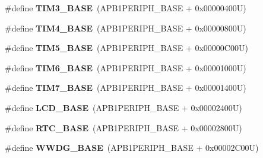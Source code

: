 \begin{DoxyCompactItemize}
\item 
\hypertarget{group___peripheral__memory__map_gaf0c34a518f87e1e505cd2332e989564a}{\#define {\bfseries T\-I\-M3\-\_\-\-B\-A\-S\-E}~(A\-P\-B1\-P\-E\-R\-I\-P\-H\-\_\-\-B\-A\-S\-E + 0x00000400\-U)}\label{group___peripheral__memory__map_gaf0c34a518f87e1e505cd2332e989564a}

\item 
\hypertarget{group___peripheral__memory__map_ga56e2d44b0002f316527b8913866a370d}{\#define {\bfseries T\-I\-M4\-\_\-\-B\-A\-S\-E}~(A\-P\-B1\-P\-E\-R\-I\-P\-H\-\_\-\-B\-A\-S\-E + 0x00000800\-U)}\label{group___peripheral__memory__map_ga56e2d44b0002f316527b8913866a370d}

\item 
\hypertarget{group___peripheral__memory__map_ga3e1671477190d065ba7c944558336d7e}{\#define {\bfseries T\-I\-M5\-\_\-\-B\-A\-S\-E}~(A\-P\-B1\-P\-E\-R\-I\-P\-H\-\_\-\-B\-A\-S\-E + 0x00000\-C00\-U)}\label{group___peripheral__memory__map_ga3e1671477190d065ba7c944558336d7e}

\item 
\hypertarget{group___peripheral__memory__map_ga8268ec947929f192559f28c6bf7d1eac}{\#define {\bfseries T\-I\-M6\-\_\-\-B\-A\-S\-E}~(A\-P\-B1\-P\-E\-R\-I\-P\-H\-\_\-\-B\-A\-S\-E + 0x00001000\-U)}\label{group___peripheral__memory__map_ga8268ec947929f192559f28c6bf7d1eac}

\item 
\hypertarget{group___peripheral__memory__map_ga0ebf54364c6a2be6eb19ded6b18b6387}{\#define {\bfseries T\-I\-M7\-\_\-\-B\-A\-S\-E}~(A\-P\-B1\-P\-E\-R\-I\-P\-H\-\_\-\-B\-A\-S\-E + 0x00001400\-U)}\label{group___peripheral__memory__map_ga0ebf54364c6a2be6eb19ded6b18b6387}

\item 
\hypertarget{group___peripheral__memory__map_ga017749aad23300240ef5ac4c3d5ca750}{\#define {\bfseries L\-C\-D\-\_\-\-B\-A\-S\-E}~(A\-P\-B1\-P\-E\-R\-I\-P\-H\-\_\-\-B\-A\-S\-E + 0x00002400\-U)}\label{group___peripheral__memory__map_ga017749aad23300240ef5ac4c3d5ca750}

\item 
\hypertarget{group___peripheral__memory__map_ga4265e665d56225412e57a61d87417022}{\#define {\bfseries R\-T\-C\-\_\-\-B\-A\-S\-E}~(A\-P\-B1\-P\-E\-R\-I\-P\-H\-\_\-\-B\-A\-S\-E + 0x00002800\-U)}\label{group___peripheral__memory__map_ga4265e665d56225412e57a61d87417022}

\item 
\hypertarget{group___peripheral__memory__map_ga9a5bf4728ab93dea5b569f5b972cbe62}{\#define {\bfseries W\-W\-D\-G\-\_\-\-B\-A\-S\-E}~(A\-P\-B1\-P\-E\-R\-I\-P\-H\-\_\-\-B\-A\-S\-E + 0x00002\-C00\-U)}\label{group___peripheral__memory__map_ga9a5bf4728ab93dea5b569f5b972cbe62}


\end{DoxyCompactItemize}
